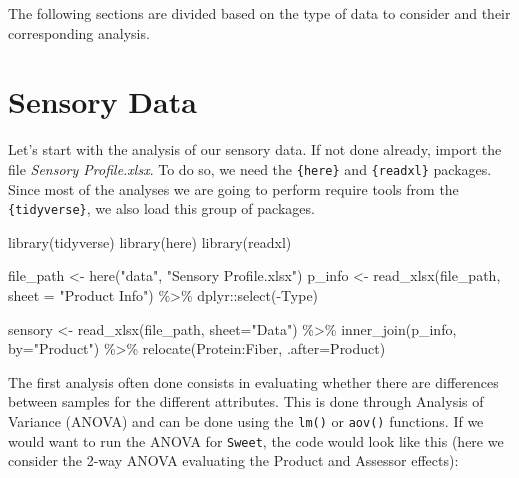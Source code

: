 \documentclass[
]{book}
\newenvironment{Shaded}{\begin{snugshade}}{\end{snugshade}}
\newcommand{\AttributeTok}[1]{\textcolor[rgb]{0.77,0.63,0.00}{#1}}
\newcommand{\FunctionTok}[1]{\textcolor[rgb]{0.00,0.00,0.00}{#1}}
\newcommand{\NormalTok}[1]{#1}
\newcommand{\OtherTok}[1]{\textcolor[rgb]{0.56,0.35,0.01}{#1}}
\newcommand{\SpecialCharTok}[1]{\textcolor[rgb]{0.00,0.00,0.00}{#1}}
\newcommand{\StringTok}[1]{\textcolor[rgb]{0.31,0.60,0.02}{#1}}
\begin{document}
The following sections are divided based on the type of data to consider and their corresponding analysis.

\hypertarget{sensory-data}{%
\section{Sensory Data}\label{sensory-data}}

Let's start with the analysis of our sensory data. If not done already, import the file \emph{Sensory Profile.xlsx}.
To do so, we need the \texttt{\{here\}} and \texttt{\{readxl\}} packages. Since most of the analyses we are going to perform require tools from the \texttt{\{tidyverse\}}, we also load this group of packages.

\begin{Shaded}
\begin{Highlighting}[]
\FunctionTok{library}\NormalTok{(tidyverse)}
\FunctionTok{library}\NormalTok{(here)}
\FunctionTok{library}\NormalTok{(readxl)}

\NormalTok{file\_path }\OtherTok{\textless{}{-}} \FunctionTok{here}\NormalTok{(}\StringTok{"data"}\NormalTok{, }\StringTok{"Sensory Profile.xlsx"}\NormalTok{) }
\NormalTok{p\_info }\OtherTok{\textless{}{-}} \FunctionTok{read\_xlsx}\NormalTok{(file\_path, }\AttributeTok{sheet =} \StringTok{"Product Info"}\NormalTok{) }\SpecialCharTok{\%\textgreater{}\%} 
\NormalTok{  dplyr}\SpecialCharTok{::}\FunctionTok{select}\NormalTok{(}\SpecialCharTok{{-}}\NormalTok{Type)}

\NormalTok{sensory }\OtherTok{\textless{}{-}} \FunctionTok{read\_xlsx}\NormalTok{(file\_path, }\AttributeTok{sheet=}\StringTok{"Data"}\NormalTok{) }\SpecialCharTok{\%\textgreater{}\%} 
  \FunctionTok{inner\_join}\NormalTok{(p\_info, }\AttributeTok{by=}\StringTok{"Product"}\NormalTok{) }\SpecialCharTok{\%\textgreater{}\%} 
  \FunctionTok{relocate}\NormalTok{(Protein}\SpecialCharTok{:}\NormalTok{Fiber, }\AttributeTok{.after=}\NormalTok{Product)}
\end{Highlighting}
\end{Shaded}

The first analysis often done consists in evaluating whether there are differences between samples for the different attributes. This is done through Analysis of Variance (ANOVA) and can be done using the \texttt{lm()} or \texttt{aov()} functions.
If we would want to run the ANOVA for \texttt{Sweet}, the code would look like this (here we consider the 2-way ANOVA evaluating the Product and Assessor effects):
\end{document}
